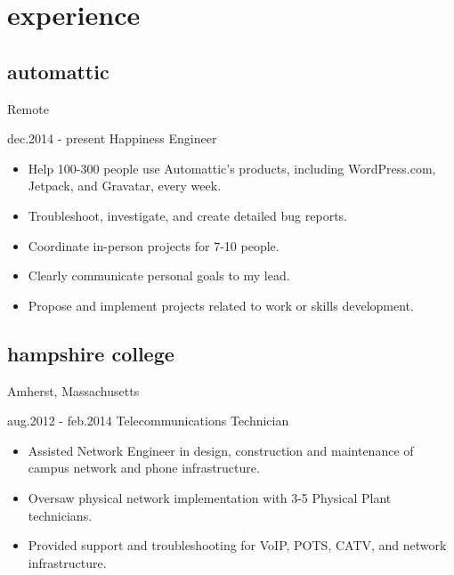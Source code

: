 \documentclass[]{friggeri-cv} %
\begin{document}
\small\bodyfont{\ }

\vspace{-3\parskip}
\section{experience}
\subsection
{automattic}
{Remote}

\begin{entrylist}
\entry
{dec.2014 - present}
{Happiness Engineer}{}
{\begin{itemize}[leftmargin=*,topsep=0pt]
\item Help 100-300 people use Automattic’s products, including WordPress.com, Jetpack, and Gravatar, every week.
\item Troubleshoot, investigate, and create detailed bug reports.
\item Coordinate in-person projects for 7-10 people.
\item Clearly communicate personal goals to my lead.
\item Propose and implement projects related to work or skills development.
\end{itemize}}
\end{entrylist}
\subsection
{hampshire college}
{Amherst, Massachusetts}

\begin{entrylist}
\entry
{aug.2012 - feb.2014}
{Telecommunications Technician}{}
{\begin{itemize}[leftmargin=*,topsep=0pt]
\item Assisted Network Engineer in design, construction and maintenance of campus network and phone infrastructure.
\item Oversaw physical network implementation with 3-5 Physical Plant technicians.
\item Provided support and troubleshooting for VoIP, POTS, CATV, and network infrastructure.
\end{itemize}}
\end{entrylist}
\end{document}
